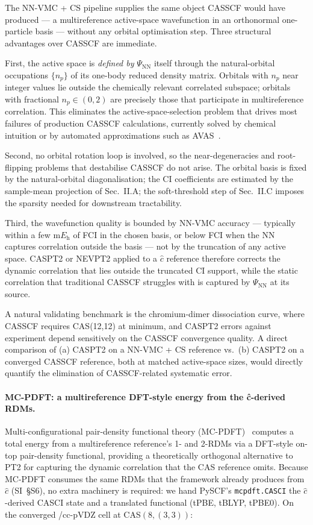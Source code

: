 \documentclass[journal=jctcce,manuscript=article,layout=traditional]{achemso}
\begin{document}
The NN-VMC + CS pipeline supplies the same object CASSCF would have
produced --- a multireference active-space wavefunction in an
orthonormal one-particle basis --- without any orbital optimisation
step. Three structural advantages over CASSCF are immediate.

First, the active space is \emph{defined by} $\Psi_{\mathrm{NN}}$
itself through the natural-orbital occupations $\{n_p\}$ of its
one-body reduced density matrix. Orbitals with $n_p$ near integer
values lie outside the chemically relevant correlated subspace;
orbitals with fractional $n_p \in (0,2)$ are precisely those that
participate in multireference correlation. This eliminates the
active-space-selection problem that drives most failures of
production CASSCF calculations, currently solved by chemical
intuition or by automated approximations such as
AVAS~\cite{Sayfutyarova2017AVAS}.

Second, no orbital rotation loop is involved, so the
near-degeneracies and root-flipping problems that destabilise CASSCF
do not arise. The orbital basis is fixed by the natural-orbital
diagonalisation; the CI coefficients are estimated by the sample-mean
projection of Sec.~II.A; the soft-threshold step of Sec.~II.C imposes
the sparsity needed for downstream tractability.

Third, the wavefunction quality is bounded by NN-VMC accuracy ---
typically within a few m$E_{\mathrm{h}}$ of FCI in the chosen basis,
or below FCI when the NN captures correlation outside the basis ---
not by the truncation of any active space. CASPT2 or NEVPT2 applied
to a $\widehat{c}$ reference therefore corrects the dynamic
correlation that lies outside the truncated CI support, while the
static correlation that traditional CASSCF struggles with is
captured by $\Psi_{\mathrm{NN}}$ at its source.

A natural validating benchmark is the chromium-dimer dissociation
curve, where CASSCF requires CAS(12,12) at minimum, and CASPT2 errors
against experiment depend sensitively on the CASSCF convergence
quality. A direct comparison of (a) CASPT2 on a NN-VMC + CS
reference vs.\ (b) CASPT2 on a converged CASSCF reference, both at
matched active-space sizes, would directly quantify the elimination
of CASSCF-related systematic error.

\paragraph{MC-PDFT: a multireference DFT-style energy from the
ĉ-derived RDMs.}
Multi-configurational pair-density functional theory
(MC-PDFT)~\cite{LiManni2014MCPDFT} computes a total energy from a
multireference reference's 1- and 2-RDMs via a DFT-style on-top
pair-density functional, providing a theoretically orthogonal
alternative to PT2 for capturing the dynamic correlation that the
CAS reference omits. Because MC-PDFT consumes the same RDMs that
the framework already produces from $\widehat c$ (SI~\S S6),
no extra machinery is required: we hand PySCF's \texttt{mcpdft.CASCI}
the $\widehat c$-derived CASCI state and a translated functional
(tPBE, tBLYP, tPBE0). On the converged
/cc-pVDZ cell at CAS$(8,(3,3))$:
\end{document}
